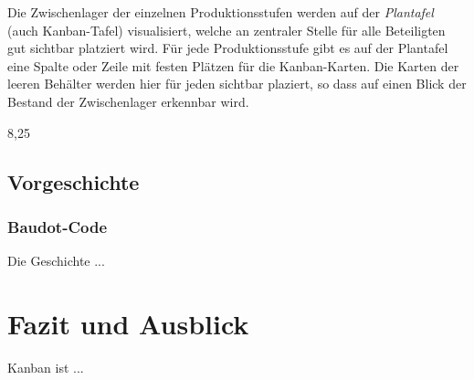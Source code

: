 Die Zwischenlager der einzelnen Produktionsstufen werden auf der \emph{Plantafel} (auch Kanban-Tafel) visualisiert, welche an zentraler Stelle für alle Beteiligten gut sichtbar platziert wird.
Für jede Produktionsstufe gibt es auf der Plantafel eine Spalte oder Zeile mit festen Plätzen für die Kanban-Karten.
Die Karten der leeren Behälter werden hier für jeden sichtbar plaziert, so dass auf einen Blick der Bestand der Zwischenlager erkennbar wird.

8,25
\subsection{Vorgeschichte}

\subsubsection{Baudot-Code}
Die Geschichte ...

\section{Fazit und Ausblick}
Kanban ist ...
